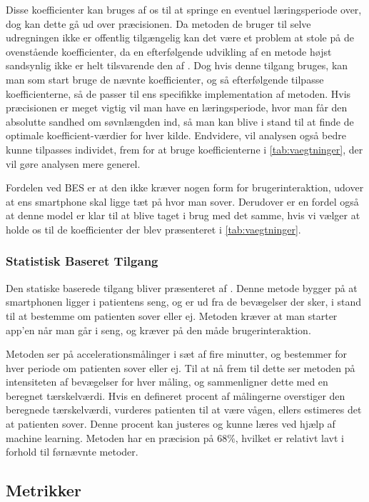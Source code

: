 Disse koefficienter kan bruges af os til at springe en eventuel læringsperiode over, dog kan dette gå ud over præcisionen. 
Da metoden de bruger til selve udregningen ikke er offentlig tilgængelig kan det være et problem at stole på de ovenstående koefficienter, da en efterfølgende udvikling af en metode højst sandsynlig ikke er helt tilsvarende den af \citet{6563918}.
Dog hvis denne tilgang bruges, kan man som start bruge de nævnte koefficienter, og så efterfølgende tilpasse koefficienterne, så de passer til ens specifikke implementation af metoden.
Hvis præcisionen er meget vigtig vil man have en læringsperiode, hvor man får den absolutte sandhed om søvnlængden ind, så man kan blive i stand til at finde de optimale koefficient-værdier for hver kilde.
Endvidere, vil analysen også bedre kunne tilpasses individet, frem for at bruge koefficienterne i \cref{tab:vaegtninger}, der vil gøre analysen mere generel.

Fordelen ved BES er at den ikke kræver nogen form for brugerinteraktion, udover at ens smartphone skal ligge tæt på hvor man sover.
Derudover er en fordel også at denne model er klar til at blive taget i brug med det samme, hvis vi vælger at holde os til de koefficienter der blev præsenteret i \cref{tab:vaegtninger}.

\subsubsection{Statistisk Baseret Tilgang}\label{sec:statbased}
Den statiske baserede tilgang bliver præsenteret af \citet{misc:statbased}.
Denne metode bygger på at smartphonen ligger i patientens seng, og er ud fra de bevægelser der sker, i stand til at bestemme om patienten sover eller ej. 
Metoden kræver at man starter app'en når man går i seng, og kræver på den måde brugerinteraktion.

Metoden ser på accelerationsmålinger i sæt af fire minutter, og bestemmer for hver periode om patienten sover eller ej.
Til at nå frem til dette ser metoden på intensiteten af bevægelser for hver måling, og sammenligner dette med en beregnet tærskelværdi.
Hvis en defineret procent af målingerne overstiger den beregnede tærskelværdi, vurderes patienten til at være vågen, ellers estimeres det at patienten sover.
Denne procent kan justeres og kunne læres ved hjælp af machine learning.
Metoden har en præcision på 68\%, hvilket er relativt lavt i forhold til førnævnte metoder.

\subsection{Metrikker}\label{sec:metrikker}
